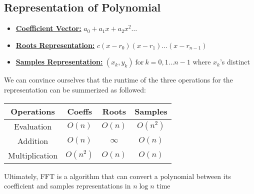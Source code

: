 \documentclass[a4paper]{article}
\begin{document}
\pagebreak
\subsection{Representation of Polynomial}
\begin{itemize}
    \item \underline{\textbf{Coefficient Vector:}} $a_0 + a_1 x + a_2 x^2 \dots$
    \item \textbf{\underline{Roots Representation:}} $c(x-r_0)(x-r_1) \dots (x-r_{n-1 })$
    \item \textbf{\underline{Samples Representation:}} $(x_k, y_k) \ \text{for} \ k = 0, 1 \dots n-1$ where $x_k$'s distinct
\end{itemize}
We can convince ourselves that the runtime of the three operations for the representation can be summerized as followed:
\begin{center}
    \begin{tabular}{ ||c|c|c|c|| }
        \hline
        Operations & Coeffs & Roots & Samples \\
        \hline \hline
        Evaluation & $O(n)$ & $O(n)$ & $O(n^2)$ \\
        \hline
        Addition & $O(n)$ & $\infty$ & $O(n)$ \\
        \hline
        Multiplication & $O(n^2)$ & $O(n)$ & $O(n)$ \\
        \hline
    \end{tabular}
\end{center}
Ultimately, FFT is a algorithm that can convert a polynomial between its coefficient and samples representations in $n \log n$ time
\end{document}
